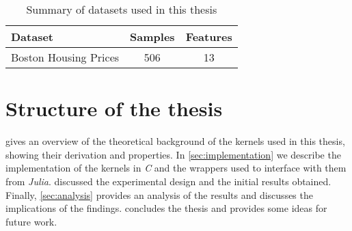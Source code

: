 \begin{table}[H]
    \caption{Summary of datasets used in this thesis}
    \label{tab:datasets}
    \begin{tabular}{lcc}
        \toprule
        Dataset & Samples & Features \\
        \midrule
        Boston Housing Prices & 506 & 13 \\
        \bottomrule
    \end{tabular}
\end{table}



\section{Structure of the thesis}

 gives an overview of the theoretical background
of the kernels used in this thesis, showing their derivation and properties. In
\cref{sec:implementation} we describe the implementation of the kernels in \emph{C}
and the wrappers used to interface with them from \emph{Julia}. 
discussed the experimental design and the initial results obtained. Finally,
\cref{sec:analysis} provides an analysis of the results and discusses the
implications of the findings.  concludes the thesis and
provides some ideas for future work.





